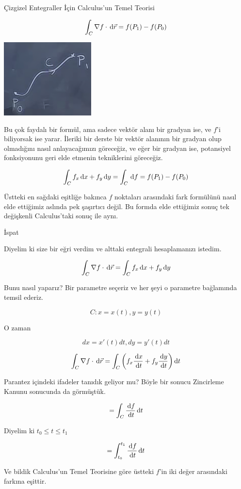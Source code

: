 \documentclass[12pt,fleqn]{article}\usepackage{../../common}
\begin{document}
Çizgizel Entegraller İçin Calculus'un Temel Teorisi

$$
\int_{C} \nabla f \cdot \,\mathrm{d}\vec{r} = 
f(P_1) - f(P_0)
$$

\includegraphics[height=4cm]{20_5.png}

Bu çok faydalı bir formül, ama sadece vektör alanı bir gradyan ise, ve $f$'i
biliyorsak ise yarar. İleriki bir derste bir vektör alanının bir gradyan olup
olmadığını nasıl anlayacağımızı göreceğiz, ve eğer bir gradyan ise, potansiyel
fonksiyonunu geri elde etmenin tekniklerini göreceğiz.

$$ \int_C f_x \,\mathrm{d} x + f_y \,\mathrm{d} y  = \int_C \,\mathrm{d} f = f(P_1) - f(P_0) $$

Üstteki en sağdaki eşitliğe bakınca $f$ noktaları arasındaki fark formülünü
nasıl elde ettiğimiz aslında pek şaşırtıcı değil. Bu formda elde ettiğimiz
sonuç tek değişkenli Calculus'taki sonuç ile aynı. 

İspat

Diyelim ki size bir eğri verdim ve alttaki entegrali hesaplamanızı
istedim. 

$$
\int_{C} \nabla f \cdot \,\mathrm{d}\vec{r} =  \int_C f_x \,\mathrm{d} x + f_y \,\mathrm{d} y
$$

Bunu nasıl yaparız? Bir parametre seçeriz ve her şeyi o parametre
bağlamında temsil ederiz. 

$$ C: x = x(t), y = y(t) $$

O zaman 

$$ dx = x'(t)dt, dy = y'(t)dt $$

$$
\int_{C} \nabla f \cdot \,\mathrm{d}\vec{r} =  
\int_C \bigg( f_x \frac{\,\mathrm{d} x}{\,\mathrm{d} t} + f_y \frac{\,\mathrm{d} y}{\,\mathrm{d} t} \bigg) \,\mathrm{d} t
$$

Parantez içindeki ifadeler tanıdık geliyor mu? Böyle bir sonucu Zincirleme
Kanunu sonucunda da görmüştük. 

$$ = \int_C \frac{\,\mathrm{d} f}{\,\mathrm{d} t} \,\mathrm{d} t $$

Diyelim ki $t_0 \le t \le t_1$

$$ = \int_{t_0}^{t_1} \frac{\,\mathrm{d} f}{\,\mathrm{d} t} \,\mathrm{d} t$$

Ve bildik Calculus'un Temel Teorisine göre üstteki $f$'in iki değer
arasındaki farkına eşittir. 
\end{document}
